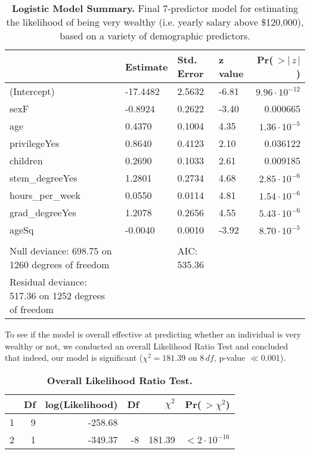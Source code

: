 \documentclass{article}
\begin{document}
\begin{table}[ht]
\centering
\begin{tabular}{llllr}
  \toprule
  & Estimate & Std. Error & z value & Pr($\,>|\,z\,|$) \\ 
  \midrule
  (Intercept) & -17.4482 & 2.5632 & -6.81 & $9.96 \cdot 10^{-12}$ \\ 
  sexF & -0.8924 & 0.2622 & -3.40 & 0.000665 \\ 
  age & 0.4370 & 0.1004 & 4.35 & $1.36 \cdot 10^{-5}$ \\ 
  privilegeYes & 0.8640 & 0.4123 & 2.10 & 0.036122 \\ 
  children & 0.2690 & 0.1033 & 2.61 & 0.009185 \\ 
  stem\_degreeYes & 1.2801 & 0.2734 & 4.68 & $2.85 \cdot 10^{-6}$ \\ 
  hours\_per\_week & 0.0550 & 0.0114 & 4.81 & $1.54 \cdot 10^{-6}$ \\ 
  grad\_degreeYes & 1.2078 & 0.2656 & 4.55 & $5.43 \cdot 10^{-6}$ \\ 
  ageSq & -0.0040 & 0.0010 & -3.92 & $8.70 \cdot 10^{-5}$ \\ 
  \bottomrule \\
  Null deviance: 698.75  on 1260  degrees of freedom & & AIC: 535.36 \\
  Residual deviance: 517.36  on 1252  degrees of freedom & &
\end{tabular}
\caption{\textbf{Logistic Model Summary.} Final 7-predictor model for estimating the likelihood of being very wealthy (i.e. yearly salary above \$120,000), based on a variety of demographic predictors.}
\label{model_logistic}
\end{table}

To see if the model is overall effective at predicting whether an individual is very wealthy or not, we conducted an overall Likelihood Ratio Test and concluded that indeed, our model is significant ($\chi^2 = 181.39$ on $8 \, df$, p-value $\ll 0.001$).

\begin{table}[ht]
\centering
\begin{tabular}{lrrrrr}
  \toprule
  & Df & log(Likelihood) & Df & $\chi^2$ & Pr($\,> \chi^2$) \\ 
  \midrule
  1 & 9 & -258.68 &  &  &  \\ 
  2 & 1 & -349.37 & -8 & 181.39 & $< 2 \cdot 10^{-16}$ \\ 
  \bottomrule
\end{tabular}
\caption{\textbf{Overall Likelihood Ratio Test.}}
\label{lrt1}
\end{table}
\end{document}
